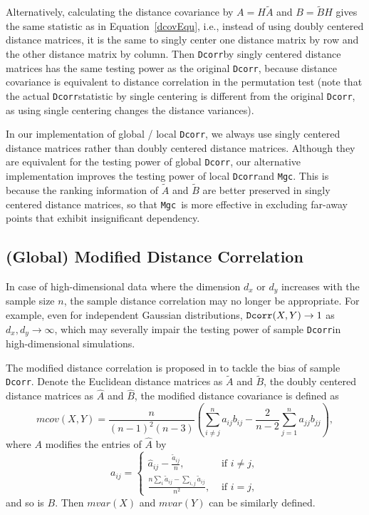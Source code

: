 \documentclass[11pt]{article}
\providecommand{\sct}[1]{{\sc \texttt{#1}}}
\newcommand{\Mgc}{\sct{Mgc}}
\newcommand{\Dcorr}{\sct{Dcorr}}
\begin{document}
Alternatively, calculating the distance covariance by $A=H\tilde{A}$ and $B=\tilde{B}H$ gives the same statistic as in Equation~\ref{dcovEqu}, i.e., instead of using doubly centered distance matrices, it is the same to singly center one distance matrix by row and the other distance matrix by column. Then \Dcorr by singly centered distance matrices has the same testing power as the original \Dcorr, because distance covariance is equivalent to distance correlation in the permutation test (note that the actual \Dcorr statistic by single centering is different from the original \Dcorr, as using single centering changes the distance variances).

In our implementation of global / local \Dcorr, we always use singly centered distance matrices rather than doubly centered distance matrices. Although they are equivalent for the testing power of global \Dcorr, our alternative implementation improves the testing power of local \Dcorr and \Mgc. This is because the ranking information of $\tilde{A}$ and $\tilde{B}$ are better preserved in singly centered distance matrices, so that \Mgc~is more effective in excluding far-away points that exhibit insignificant dependency.

\subsection{(Global) Modified Distance Correlation}
\label{appen:mcorr}
In case of high-dimensional data where the dimension $d_{x}$ or $d_{y}$ increases with the sample size $n$, the sample distance correlation may no longer be appropriate. For example, even for independent Gaussian distributions, $\Dcorr(X,Y) \rightarrow 1$ as $d_{x}, d_{y} \rightarrow \infty$, which may severally impair the testing power of sample \Dcorr in high-dimensional simulations.

The modified distance correlation is proposed in \cite{SzekelyRizzo2013a} to tackle the bias of sample \Dcorr. Denote the Euclidean distance matrices as $\tilde{A}$ and $\tilde{B}$, the doubly centered distance matrices as $\hat{A}$ and $\hat{B}$, the modified distance covariance is defined as
\begin{equation}
\label{mcovEqu}
mcov(X,Y)=\frac{n}{(n-1)^2(n-3)}(\sum_{i \neq j}^{n}a_{ij}b_{ij}-\frac{2}{n-2}\sum_{j=1}^{n}a_{jj}b_{jj}),
\end{equation}
where $A$ modifies the entries of $\hat{A}$ by
\[a_{ij} = \left\{
  \begin{array}{lr}
    \hat{a}_{ij}-\frac{\tilde{a}_{ij}}{n}, & \mbox{ if } i \neq j, \\
    \frac{n\sum_{i}\tilde{a}_{ij}-\sum_{i,j}\tilde{a}_{ij}}{n^2}, &\mbox{ if } i = j,
  \end{array}
\right.
\]
and so is $B$. Then $mvar(X)$ and $mvar(Y)$ can be similarly defined. 
\end{document}
